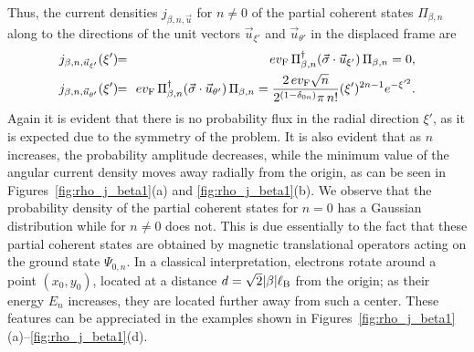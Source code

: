 \documentclass[aps,showpacs,showkeys]{revtex4}
\begin{document}
Thus, the current densities  $j_{\beta,n,\vec{u}}$ for $n\neq0$ of the partial coherent states $\Pi_{\beta,n}$ along to the directions of the unit vectors $\vec{u}_{\xi'}$ and $\vec{u}_{\theta'}$ in the displaced frame are 
\begin{eqnarray}
j_{\beta,n,\vec{u}_{\xi'}}(\xi')\!&\!=\!& \!
ev_{\rm F} \, \Pi^\dagger_{\beta,n}(\vec{\sigma}\cdot\vec{u}_{\xi'})\, \Pi_{\beta,n}=0, \label{69a} 
\\ 
 j_{\beta,n,\vec{u}_{\theta'}}(\xi')\!&\!=\!&\! ev_{\rm F}\,  \Pi^\dagger_{\beta,n} (\vec{\sigma}\cdot\vec{u}_{\theta'})\,\Pi_{\beta,n} =\frac{2\,ev_{\rm F}\sqrt{n}}{2^{(1-\delta_{0n})}\pi\,n!}(\xi')^{2n-1} e^{-\xi'^2}. \label{69b}
\end{eqnarray}
Again it  is evident that there is no probability flux in the radial direction $\xi'$, as it is expected due to the symmetry of the problem. It is also evident that as $n$ increases, the probability amplitude decreases, while the minimum value of the angular current density moves away radially from the origin, as can be seen in Figures~\ref{fig:rho_j_beta1}(a) and \ref{fig:rho_j_beta1}(b). We observe that the probability density of the partial coherent states for $n=0$ has a Gaussian distribution while for $n\neq0$ does not. This is due essentially to the fact that these partial coherent states are obtained by magnetic translational operators acting on the ground state $\Psi_{0,n}$. In a classical interpretation,  electrons rotate around a point $(x_0,y_0)$, located at a distance $d=\sqrt{2}\vert \beta\vert\ell_{\rm B}$ from the origin; as their energy $E_n$ increases, they are located further away from such a center. These features can be appreciated in the examples shown in 
Figures~\ref{fig:rho_j_beta1}(a)--\ref{fig:rho_j_beta1}(d).
\end{document}
